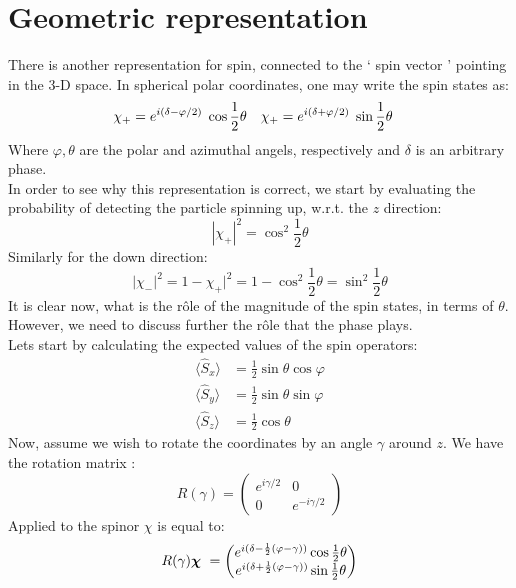 \section{Geometric representation}
There is another representation for spin, connected to the ` spin vector ' pointing in the 3-D space. In spherical polar coordinates, one may write the spin states as:
\unboldmath
\begin{align}
\unboldmath
\chi_+  &= e^{i\left( \delta- \varphi/2\right) }\;\cos \frac{1}{2} \theta & \chi_+  &= e^{i\left( \delta+ \varphi/2\right) }\;\sin\frac{1}{2}\theta 
\end{align}
Where $ \varphi , \theta$ are the polar and azimuthal angels, respectively and $\delta$ is an arbitrary phase.\\ In order to see why this representation is correct, we start by evaluating the probability of detecting the particle spinning up, w.r.t. the $z$ direction:
\begin{equation}
| \chi_+|^2 = \cos^2 \frac{1}{2}\theta 
\end{equation}
Similarly for the down direction:
\begin{equation}
| \chi_-|^2= 1- \chi_+|^2 =1- \cos^2 \frac{1}{2}\theta = \sin^2 \frac{1}{2}\theta 
\end{equation}
It is clear now, what is the r\^{o}le of the magnitude of the spin states, in terms of $ \theta$. However, we need to discuss further the r\^{o}le that the phase plays. \\ Lets start by calculating the expected values of the spin operators:
\begin{align}
\langle \hat S_x\rangle &= \frac{1}{2} \sin \theta \cos \varphi \nonumber \\
\langle \hat S_y\rangle &= \frac{1}{2} \sin \theta \sin\varphi \\
\langle \hat S_z\rangle &= \frac{1}{2} \cos \theta \nonumber 
\end{align}
Now, assume we wish to rotate the coordinates by an angle $ \gamma$ around $ z$. We have the rotation matrix :
\begin{equation}
R(\gamma) = \begin{pmatrix}
e^ {i \gamma/2} & 0 \\
0&	 e^ {-i \gamma/2} 
\end{pmatrix}
\end{equation}
Applied to the spinor \boldmath$\chi$ is equal to:
\unboldmath
\begin{equation}
R(\gamma)	\mbox{\boldmath $\chi$ } = \unboldmath \begin{pmatrix}
e^ {i(\delta - \frac{1}{2}(\varphi-\gamma))} \cos \frac{1}{2}\theta \\
e^ {i(\delta +\frac{1}{2}(\varphi-\gamma))} \sin \frac{1}{2}\theta
\end{pmatrix}
\end{equation}
